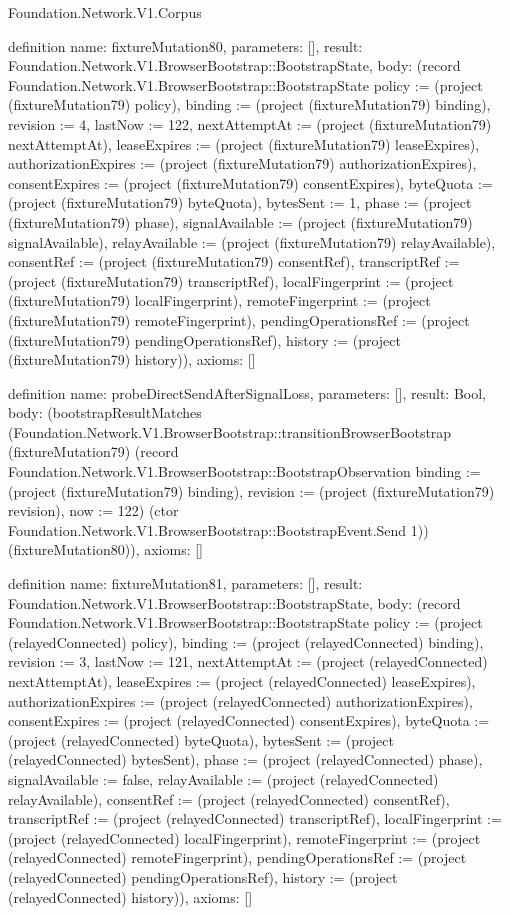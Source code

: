 \begin{lexlean}{Foundation.Network.V1.Corpus}
\begin{semanticmodule}
definition{
  name: fixtureMutation80,
  parameters: [],
  result: Foundation.Network.V1.BrowserBootstrap::BootstrapState,
  body: (record Foundation.Network.V1.BrowserBootstrap::BootstrapState {policy := (project (fixtureMutation79) policy), binding := (project (fixtureMutation79) binding), revision := 4, lastNow := 122, nextAttemptAt := (project (fixtureMutation79) nextAttemptAt), leaseExpires := (project (fixtureMutation79) leaseExpires), authorizationExpires := (project (fixtureMutation79) authorizationExpires), consentExpires := (project (fixtureMutation79) consentExpires), byteQuota := (project (fixtureMutation79) byteQuota), bytesSent := 1, phase := (project (fixtureMutation79) phase), signalAvailable := (project (fixtureMutation79) signalAvailable), relayAvailable := (project (fixtureMutation79) relayAvailable), consentRef := (project (fixtureMutation79) consentRef), transcriptRef := (project (fixtureMutation79) transcriptRef), localFingerprint := (project (fixtureMutation79) localFingerprint), remoteFingerprint := (project (fixtureMutation79) remoteFingerprint), pendingOperationsRef := (project (fixtureMutation79) pendingOperationsRef), history := (project (fixtureMutation79) history)}),
  axioms: []
}

definition{
  name: probeDirectSendAfterSignalLoss,
  parameters: [],
  result: Bool,
  body: (bootstrapResultMatches (Foundation.Network.V1.BrowserBootstrap::transitionBrowserBootstrap (fixtureMutation79) (record Foundation.Network.V1.BrowserBootstrap::BootstrapObservation {binding := (project (fixtureMutation79) binding), revision := (project (fixtureMutation79) revision), now := 122}) (ctor Foundation.Network.V1.BrowserBootstrap::BootstrapEvent.Send 1)) (fixtureMutation80)),
  axioms: []
}

definition{
  name: fixtureMutation81,
  parameters: [],
  result: Foundation.Network.V1.BrowserBootstrap::BootstrapState,
  body: (record Foundation.Network.V1.BrowserBootstrap::BootstrapState {policy := (project (relayedConnected) policy), binding := (project (relayedConnected) binding), revision := 3, lastNow := 121, nextAttemptAt := (project (relayedConnected) nextAttemptAt), leaseExpires := (project (relayedConnected) leaseExpires), authorizationExpires := (project (relayedConnected) authorizationExpires), consentExpires := (project (relayedConnected) consentExpires), byteQuota := (project (relayedConnected) byteQuota), bytesSent := (project (relayedConnected) bytesSent), phase := (project (relayedConnected) phase), signalAvailable := false, relayAvailable := (project (relayedConnected) relayAvailable), consentRef := (project (relayedConnected) consentRef), transcriptRef := (project (relayedConnected) transcriptRef), localFingerprint := (project (relayedConnected) localFingerprint), remoteFingerprint := (project (relayedConnected) remoteFingerprint), pendingOperationsRef := (project (relayedConnected) pendingOperationsRef), history := (project (relayedConnected) history)}),
  axioms: []
}


\end{semanticmodule}
\end{lexlean}
